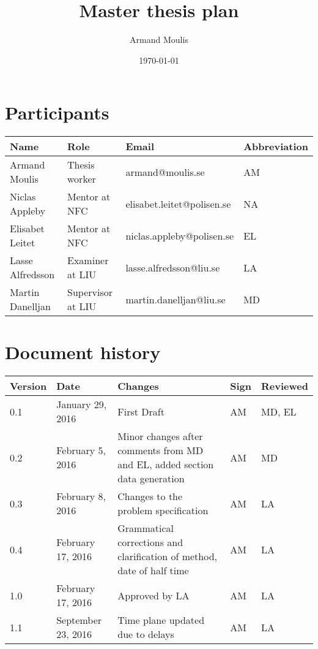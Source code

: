 \documentclass{article}
\begin{document}
	



\title{Master thesis plan}
\author{Armand Moulis}
\date{\today}
\maketitle
\newpage

\section*{Participants}

\begin{center}

	\begin{tabular}{|l|l|l|l|}
		\hline
		Name             & Role            & Email                      & Abbreviation \\ \hline
		Armand Moulis    & Thesis worker   & armand@moulis.se           & AM           \\ \hline
		Niclas Appleby   & Mentor at NFC   & elisabet.leitet@polisen.se & NA           \\ \hline
		Elisabet Leitet  & Mentor at NFC   & niclas.appleby@polisen.se  & EL           \\ \hline
		Lasse Alfredsson & Examiner at LIU & lasse.alfredsson@liu.se    & LA           \\ \hline
		Martin Danelljan & Supervisor at LIU   & martin.danelljan@liu.se    & MD           \\ \hline
	\end{tabular}
\end{center}
\newpage


\newpage
\setcounter{tocdepth}{3}
\tableofcontents
\newpage

\section*{Document history}
\begin{center}
	\begin{tabular}{|l|l| p{5cm} |l|l| }
		\hline
		Version &  Date  & Changes     & Sign & Reviewed \\ \hline
		  0.1   & January 29, 2016 & First Draft & AM  & MD, EL \\ \hline
		  0.2   & February 5, 2016 & Minor changes after comments from MD and EL, added section data generation & AM  & MD  \\ \hline
		  0.3   & February 8, 2016 & Changes to the problem specification  & AM  & LA  \\ \hline
		  0.4   & February 17, 2016 & Grammatical corrections and clarification of method, date of half time & AM  &  LA\\ \hline
		  1.0   & February 17, 2016 & Approved by LA & AM  &  LA\\ \hline
		  1.1   & September 23, 2016 & Time plane updated due to delays & AM  &  LA\\ \hline
	\end{tabular}
\end{center}
\newpage
\end{document}
